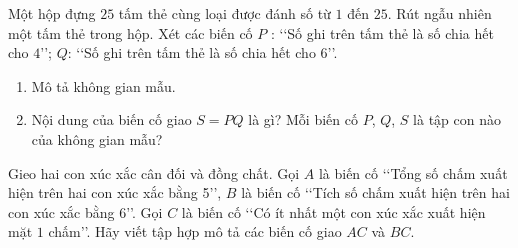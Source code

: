 \begin{vd}%
	Một hộp đựng $25$ tấm thẻ cùng loại được đánh số từ $1$ đến $25$. Rút ngẫu nhiên một tấm thẻ trong hộp. Xét các biến cố $P$ : \lq\lq Số ghi trên tấm thẻ là số chia hết cho $4$\rq\rq; $Q$: \lq\lq Số ghi trên tấm thẻ là số chia hết cho $6$\rq\rq.
	\begin{enumerate}
		\item Mô tả không gian mẫu.
		\item Nội dung của biến cố giao $S=P Q$ là gì? Mỗi biến cố $P$, $Q$, $S$ là tập con nào của không gian mẫu?
	\end{enumerate} 
\end{vd}
\begin{vd}%
	Gieo hai con xúc xắc cân đối và đồng chất. Gọi $A$ là biến cố \lq\lq Tổng số chấm xuất hiện trên hai con xúc xắc bằng 5\rq\rq, $B$ là biến cố \lq\lq Tích số chấm xuất hiện trên hai con xúc xắc bằng 6\rq\rq. Gọi $C$ là biến cố \lq\lq Có ít nhất một con xúc xắc xuất hiện mặt $1$ chấm\rq\rq. Hãy viết tập hợp mô tả các biến cố giao $AC$ và $BC$.
\end{vd}
